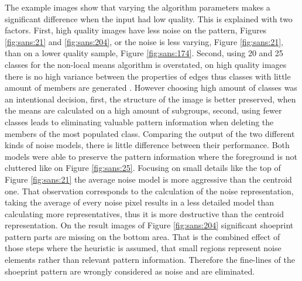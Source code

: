 \documentclass[draft,final]{vutinfth} %
\begin{document}
\par
The example images show that varying the algorithm parameters makes a significant difference when the input had low quality.
This is explained with two factors.
First, high quality images have less noise on the pattern, Figures \ref{fig:sans:21} and \ref{fig:sans:204}, or the noise is less varying, Figure \ref{fig:sans:21}, than on a lower quality sample, Figure \ref{fig:sans:174}.
Second, using 20 and 25 classes for the non-local means algorithm is overstated, on high quality images there is no high variance between the properties of edges thus classes with little amount of members are generated .
However choosing high amount of classes was an intentional decision, first, the structure of the image is better preserved, when the means are calculated on a high amount of subgroups, second, using fewer classes leads to eliminating valuable pattern information when deleting the members of the most populated class.
Comparing the output of the two different kinds of noise models, there is little difference between their performance.
Both models were able to preserve the pattern information where the foreground is not cluttered like on Figure \ref{fig:sans:25}.
Focusing on small details like the top of Figure \ref{fig:sans:21} the average noise model is more aggressive than the centroid one.
That observation corresponds to the calculation of the noise representation, taking the average of every noise pixel results in a less detailed model than calculating more representatives, thus it is more destructive than the centroid representation.
On the result images of Figure \ref{fig:sans:204} significant shoeprint pattern parts are missing on the bottom area.
That is the combined effect of those steps where the heuristic is assumed, that small regions represent noise elements rather than relevant pattern information.
Therefore the fine-lines of the shoeprint pattern are wrongly considered as noise and are eliminated.
\end{document}
